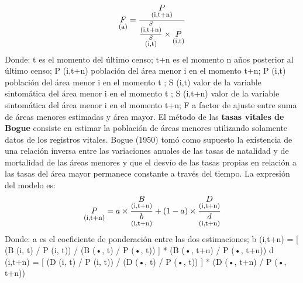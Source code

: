\documentclass{article}
\theoremstyle{mytheoremstyle}
\theoremstyle{mytheoremstyle}
\theoremstyle{myproblemstyle}
\begin{document}
\begin{equation}
  \underset{\textstyle \text{\footnotesize(a)}}{F}=\frac{\underset{\textstyle \text{\footnotesize(i,t+n)}}{P}}
  {\frac{\underset{\textstyle\text{\footnotesize(i,t+n)}}{S}}{\underset{\textstyle\text{\footnotesize(i,t)}}{S}}
  \times
   \underset{\textstyle \text{\footnotesize(i,t)}}{P} }
\end{equation}
\newline
Donde:\newline
t es el momento del último censo;\newline
t+n es el momento n años posterior al último censo;\newline
P (i,t+n) población del área menor i en el momento t+n;\newline
P (i,t) población del área menor i en el momento t ;\newline
S (i,t) valor de la variable sintomática del área menor i en el momento t ;\newline
S (i,t+n) valor de la variable sintomática del área menor i en el momento t+n;\newline
F a factor de ajuste entre suma de áreas menores estimadas y área mayor.\newline
\newline
El método de las \textbf{tasas vitales de Bogue} consiste en estimar la población de áreas menores
utilizando solamente datos de los registros vitales. Bogue (1950) tomó como supuesto la
existencia de una relación inversa entre las variaciones anuales de las tasas de natalidad y de
mortalidad de las áreas menores y que el desvío de las tasas propias en relación a las tasas del área
mayor permanece constante a través del tiempo. La expresión del modelo es:
\newline
\begin{equation}
  \underset{\textstyle \text{\footnotesize(i,t+n)}}{P}=a \times \frac{\underset{\textstyle \text{\footnotesize(i,t+n)}}{B}}
{\underset{\textstyle\text{\footnotesize(i,t+n)}}{b}} + (1-a)\times
\frac{\underset{\textstyle \text{\footnotesize(i,t+n)}}{D}}
{\underset{\textstyle\text{\footnotesize(i,t+n)}}{d}}
\end{equation}
\newline
Donde:\newline
a es el coeficiente de ponderación entre las dos estimaciones;\newline
b (i,t+n) = [ (B (i, t) / P (i, t)) / (B (•, t) / P (•, t)) ] * (B (•, t+n) / P (•, t+n))\newline
d (i,t+n) = [ (D (i, t) / P (i, t)) / (D (•, t) / P (•, t)) ] * (D (•, t+n) / P (•, t+n))\newline
\end{document}
